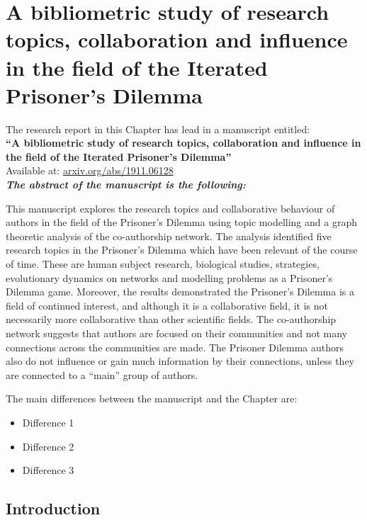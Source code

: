 \chapter{A bibliometric study of research topics, collaboration and influence in
the field of the Iterated Prisoner's Dilemma}\label{chapter:bibliometric_study}

\begin{center}
    The research report in this Chapter has lead in a manuscript entitled: \\
    \textbf{``A bibliometric study of research topics, collaboration and influence in the field of the Iterated Prisoner's Dilemma''} \\
    Available at: \url{arxiv.org/abs/1911.06128} \\ \vspace{.5cm}
    \textit{\textbf{The abstract of the manuscript is the following:}}
\end{center}

This manuscript explores the research topics and collaborative behaviour of
authors in the field of the Prisoner's Dilemma using topic modelling and a graph
theoretic analysis of the co-authorship network. The analysis identified five
research topics in the Prisoner's Dilemma which have been relevant of the course
of time. These are human subject research, biological studies, strategies,
evolutionary dynamics on networks and modelling problems as a Prisoner's Dilemma
game. Moreover, the results demonstrated the Prisoner's Dilemma is a field of
continued interest, and although it is a collaborative field, it is not
necessarily more collaborative than other scientific fields. The co-authorship
network suggests that authors are focused on their communities and not many
connections across the communities are made. The Prisoner Dilemma authors also
do not influence or gain much information by their connections, unless they are
connected to a ``main'' group of authors.

The main differences between the manuscript and the Chapter are:

\begin{itemize}
    \item Difference 1
    \item Difference 2
    \item Difference 3
\end{itemize}

\section{Introduction}\label{section:introduction}

